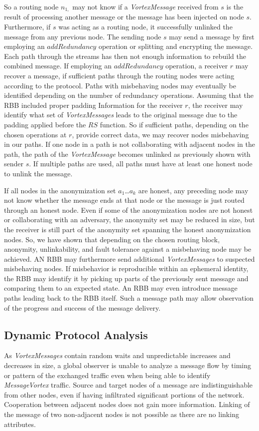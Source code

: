 \documentclass[acmsmall, screen, review]{acmart}
\begin{document}
So a routing node $n_{1,}$ may not know if a \emph{VortexMessage} received from $s$ is the result of processing another message or the message has been injected on node $s$. Furthermore, if $s$ was acting as a routing node, it successfully unlinked the message from any previous node. The sending node $s$ may send a message by first employing an $addRedundancy$ operation or splitting and encrypting the message. Each path through the streams has then not enough information to rebuild the combined message. If employing an $addRedundancy$ operation, a receiver $r$ may recover a message, if sufficient paths through the routing nodes were acting according to the protocol. Paths with misbehaving nodes may eventually be identified depending on the number of redundancy operations. Assuming that the RBB included proper padding Information for the receiver $r$, the receiver may identify what set of \emph{VortexMessages} leads to the original message due to the padding applied before the $RS$ function. So if sufficient paths, depending on the chosen operations at $r$, provide correct data, we may recover nodes misbehaving in our paths. If one node in a path is not collaborating with adjacent nodes in the path, the path of the \emph{VortexMessage} becomes unlinked as previously shown with sender $s$. If multiple paths are used, all paths must have at least one honest node to unlink the message. 

If all nodes in the anonymization set $a_1$\ldots$a_k$ are honest, any preceding node may not know whether the message ends at that node or the message is just routed through an honest node. Even if some of the anonymization nodes are not honest or collaborating with an adversary, the anonymity set may be reduced in size, but the receiver is still part of the anonymity set spanning the honest anonymization nodes. So, we have shown that depending on the chosen routing block, anonymity, unlinkability, and fault tolerance against a misbehaving node may be achieved. AN RBB may furthermore send additional \emph{VortexMessages} to suspected misbehaving nodes. If misbehavior is reproducible within an ephemeral identity, the RBB may identify it by picking up parts of the previously sent message and comparing them to an expected state. An RBB may even introduce message paths leading back to the RBB itself. Such a message path may allow observation of the progress and success of the message delivery.

\subsection{Dynamic Protocol Analysis\label{sec:dynamicAnalysis}}
As \emph{VortexMessages} contain random waits and unpredictable increases and decreases in size, a global observer is unable to analyze a message flow by timing or pattern of the exchanged traffic even when being able to identify \emph{MessageVortex} traffic. Source and target nodes of a message are indistinguishable from other nodes, even if having infiltrated significant portions of the network. Cooperation between adjacent nodes does not gain more information. Linking of the message of two non-adjacent nodes is not possible as there are no linking attributes.
\end{document}
